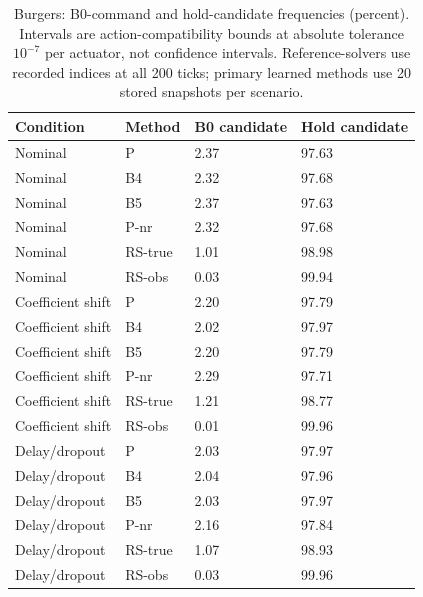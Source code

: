 \begin{table}[ht]
\caption{Burgers: B0-command and hold-candidate frequencies (percent). Intervals are action-compatibility bounds at absolute tolerance $10^{-7}$ per actuator, not confidence intervals. Reference-solvers use recorded indices at all 200 ticks; primary learned methods use 20 stored snapshots per scenario.}\label{tab:choices_burgers}
\centering\small
\begin{tabular}{@{}llll@{}}\toprule
Condition & Method & B0 candidate & Hold candidate\\\midrule
Nominal & P & 2.37 & 97.63 \\
Nominal & B4 & 2.32 & 97.68 \\
Nominal & B5 & 2.37 & 97.63 \\
Nominal & P-nr & 2.32 & 97.68 \\
Nominal & RS-true & 1.01 & 98.98 \\
Nominal & RS-obs & 0.03 & 99.94 \\
Coefficient shift & P & 2.20 & 97.79 \\
Coefficient shift & B4 & 2.02 & 97.97 \\
Coefficient shift & B5 & 2.20 & 97.79 \\
Coefficient shift & P-nr & 2.29 & 97.71 \\
Coefficient shift & RS-true & 1.21 & 98.77 \\
Coefficient shift & RS-obs & 0.01 & 99.96 \\
Delay/dropout & P & 2.03 & 97.97 \\
Delay/dropout & B4 & 2.04 & 97.96 \\
Delay/dropout & B5 & 2.03 & 97.97 \\
Delay/dropout & P-nr & 2.16 & 97.84 \\
Delay/dropout & RS-true & 1.07 & 98.93 \\
Delay/dropout & RS-obs & 0.03 & 99.96 \\
\bottomrule\end{tabular}
\end{table}
